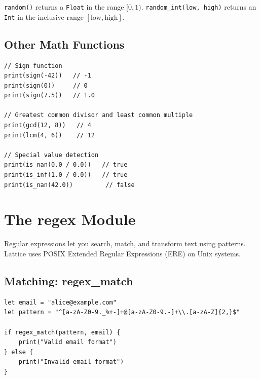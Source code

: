 \lstinline|random()| returns a \lstinline|Float| in the range $[0, 1)$.
\lstinline|random_int(low, high)| returns an \lstinline|Int| in the
inclusive range $[\text{low}, \text{high}]$.

\subsection{Other Math Functions}\label{sec:math-other}


\begin{lstlisting}[language=Lattice, caption={Additional math functions}]
// Sign function
print(sign(-42))   // -1
print(sign(0))     // 0
print(sign(7.5))   // 1.0

// Greatest common divisor and least common multiple
print(gcd(12, 8))   // 4
print(lcm(4, 6))    // 12

// Special value detection
print(is_nan(0.0 / 0.0))   // true
print(is_inf(1.0 / 0.0))   // true
print(is_nan(42.0))         // false
\end{lstlisting}

\section{The regex Module}\label{sec:regex-module}


Regular expressions let you search, match, and transform text using
patterns. Lattice uses POSIX Extended Regular Expressions (ERE) on Unix
systems.

\subsection{Matching: regex\_match}\label{sec:regex-match}

\begin{lstlisting}[language=Lattice, caption={Testing if a string matches a pattern}]
let email = "alice@example.com"
let pattern = "^[a-zA-Z0-9._%+-]+@[a-zA-Z0-9.-]+\\.[a-zA-Z]{2,}$"

if regex_match(pattern, email) {
    print("Valid email format")
} else {
    print("Invalid email format")
}
\end{lstlisting}

